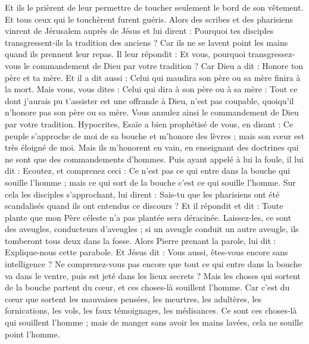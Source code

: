 \begin{multicols}{2}
Et ils le prièrent de leur permettre de toucher seulement le bord de son vêtement. Et tous ceux qui le touchèrent furent guéris.
\VerseOne{}Alors des scribes et des pharisiens vinrent de Jérusalem auprès de Jésus et lui dirent :
Pourquoi tes disciples transgressent-ils la tradition des anciens ? Car ils ne se lavent point les mains quand ils prennent leur repas.
Il leur répondit : Et vous, pourquoi transgressez-vous le commandement de Dieu par votre tradition ?
Car Dieu a dit : Honore ton père et ta mère. Et il a dit aussi : Celui qui maudira son père ou sa mère finira à la mort.
Mais vous, vous dites : Celui qui dira à son père ou à sa mère : Tout ce dont j'aurais pu t'assister est une offrande à Dieu, n'est pas coupable, quoiqu'il n'honore pas son père ou sa mère.
Vous annulez ainsi le commandement de Dieu par votre tradition.
Hypocrites, Esaïe a bien prophétisé de vous, en disant :
Ce peuple s'approche de moi de sa bouche et m'honore des lèvres ; mais son cœur est très éloigné de moi.
 Mais ils m'honorent en vain, en enseignant des doctrines qui ne sont que des commandements d'hommes.
Puis ayant appelé à lui la foule, il lui dit : Ecoutez, et comprenez ceci :
Ce n'est pas ce qui entre dans la bouche qui souille l'homme ; mais ce qui sort de la bouche c'est ce qui souille l'homme.
Sur cela les disciples s'approchant, lui dirent : Sais-tu que les pharisiens ont été scandalisés quand ils ont entendus ce discours ?
Et il répondit et dit : Toute plante que mon Père céleste n'a pas plantée sera déracinée.
Laissez-les, ce sont des aveugles, conducteurs d'aveugles ; si un aveugle conduit un autre aveugle, ils tomberont tous deux dans la fosse.
Alors Pierre prenant la parole, lui dit : Explique-nous cette parabole.
Et Jésus dit : Vous aussi, êtes-vous encore sans intelligence ?
Ne comprenez-vous pas encore que tout ce qui entre dans la bouche va dans le ventre, puis est jeté dans les lieux secrets ?
Mais les choses qui sortent de la bouche partent du cœur, et ces choses-là souillent l'homme.
Car c'est du cœur que sortent les mauvaises pensées, les meurtres, les adultères, les fornications, les vols, les faux témoignages, les médisances.
Ce sont ces choses-là qui souillent l'homme ; mais de manger sans avoir les mains lavées, cela ne souille point l'homme.

\end{multicols}
